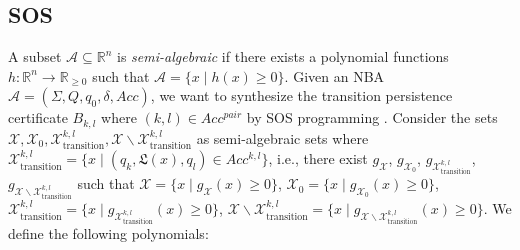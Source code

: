 \documentclass[acmlarge]{acmart}
\begin{document}
\subsection{SOS}
A subset $\mathcal{A} \subseteq \mathbb{R}^n$ is \textit{semi-algebraic} if there exists a polynomial functions $h:\mathbb{R}^n \rightarrow \mathbb{R}_{\geq 0}$ such that $\mathcal{A} = \{x \mid h(x) \geq 0\}$. Given an NBA $\mathcal{A} = (\Sigma, Q, q_0, \delta, Acc)$, we want to synthesize the transition persistence certificate $B_{k, l}$ where $(k, l) \in Acc^{pair}$ by SOS programming \cite{parrilo2003semidefinite}. Consider the sets $\mathcal{X}, \mathcal{X}_{0}, \mathcal{X}_{\text{transition}}^{k, l}, \mathcal{X} \backslash \mathcal{X}_{\text{transition}}^{k, l}$ as semi-algebraic sets where $\mathcal{X}_{\text{transition}}^{k, l} = \{x \mid (q_k, \mathfrak{L}(x), q_l) \in Acc^{k, l}\}$, i.e.,
there exist $g_{\mathcal{X}}$, $g_{\mathcal{X}_0}$, $g_{\mathcal{X}_{\text{transition}}^{k, l}}$, $g_{\mathcal{X} \backslash \mathcal{X}_{\text{transition}}^{k, l}}$ such that $\mathcal{X} = \{x \mid g_{\mathcal{X}}(x) \geq 0\}$, $\mathcal{X}_{0} = \{x \mid g_{\mathcal{X}_0}(x) \geq 0\}$, $\mathcal{X}_{\text{transition}}^{k,l} = \{x \mid g_{\mathcal{X}_{\text{transition}}^{k,l}}(x) \geq 0\}$, $\mathcal{X} \backslash \mathcal{X}_{\text{transition}}^{k,l} = \{x \mid g_{\mathcal{X} \backslash \mathcal{X}_{\text{transition}}^{k,l}}(x) \geq 0\}$. We define the following polynomials:
\end{document}
